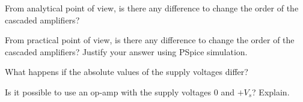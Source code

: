 \documentclass[11pt]{article}
\begin{document}


\begin{question}


\begin{subquestion}{From analytical point of view, is there any difference to change the order of the cascaded amplifiers?}
\answer{}
\end{subquestion}

\begin{subquestion}{From practical point of view, is there any difference to change the order of the cascaded amplifiers? Justify your answer using PSpice simulation.}
\answer{}
\end{subquestion}

\end{question}


\begin{question}


\begin{subquestion}{What happens if the absolute values of the supply voltages differ? }
\answer{}
\end{subquestion}

\begin{subquestion}{Is it possible to use an op-amp with the supply voltages $0$ and $+V_s$? Explain.}
\answer{}
\end{subquestion}

\end{question}



\begin{question}


\end{question}

\end{document}
